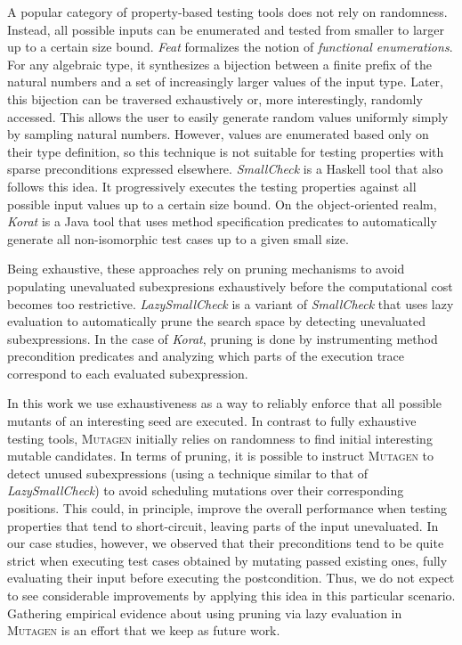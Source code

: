 \documentclass[acmsmall, anonymous]{acmart}
\newcommand{\mutagen}{\textsc{Mutagen}\xspace}
\begin{document}
A popular category of property-based testing tools does not rely on randomness.
%
Instead, all possible inputs can be enumerated and tested from smaller to larger
up to a certain size bound.
%
%
%
\emph{Feat} \cite{DuregardJW12} formalizes the notion of \emph{functional
  enumerations}.
%
For any algebraic type, it synthesizes a bijection between a finite prefix of
the natural numbers and a set of increasingly larger values of the input type.
%
Later, this bijection can be traversed exhaustively or, more interestingly,
randomly accessed.
%
This allows the user to easily generate random values uniformly simply by
sampling natural numbers.
%
However, values are enumerated based only on their type definition, so this
technique is not suitable for testing properties with sparse preconditions
expressed elsewhere.
%
\emph{SmallCheck} \cite{runciman2008smallcheck} is a Haskell tool that also
follows this idea.
%
It progressively executes the testing properties against all possible input
values up to a certain size bound.
%
On the object-oriented realm, \emph{Korat} \cite{boyapati2002korat} is a Java
tool that uses method specification predicates to automatically generate all
non-isomorphic test cases up to a given small size.


Being exhaustive, these approaches rely on pruning mechanisms to avoid
populating unevaluated subexpresions exhaustively before the computational cost
becomes too restrictive.
%
\emph{LazySmallCheck} is a variant of \emph{SmallCheck} that uses lazy
evaluation to automatically prune the search space by detecting unevaluated
subexpressions.
%
In the case of \emph{Korat}, pruning is done by instrumenting method
precondition predicates and analyzing which parts of the execution trace
correspond to each evaluated subexpression.


In this work we use exhaustiveness as a way to reliably enforce that all
possible mutants of an interesting seed are executed.
%
In contrast to fully exhaustive testing tools, \mutagen initially relies on
randomness to find initial interesting mutable candidates.
%
In terms of pruning, it is possible to instruct \mutagen to detect unused
subexpressions (using a technique similar to that of \emph{LazySmallCheck}) to
avoid scheduling mutations over their corresponding positions.
%
This could, in principle, improve the overall performance when testing
properties that tend to short-circuit, leaving parts of the input unevaluated.
%
In our case studies, however, we observed that their preconditions tend to be
quite strict when executing test cases obtained by mutating passed existing
ones, fully evaluating their input before executing the postcondition.
%
Thus, we do not expect to see considerable improvements by applying this idea in
this particular scenario.
%
Gathering empirical evidence about using pruning via lazy evaluation in \mutagen
is an effort that we keep as future work.
\end{document}
